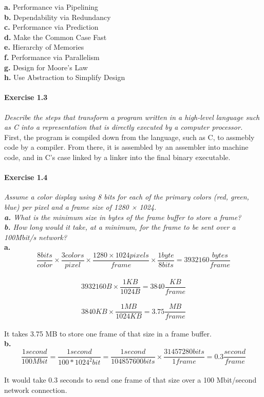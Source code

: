 \documentclass[12pt]{article}
\begin{document}
\noindent
\textbf{a.} Performance via Pipelining\\
\textbf{b.} Dependability via Redundancy\\
\textbf{c.} Performance via Prediction\\
\textbf{d.} Make the Common Case Fast\\
\textbf{e.} Hierarchy of Memories\\
\textbf{f.} Performance via Parallelism\\
\textbf{g.} Design for Moore's Law\\
\textbf{h.} Use Abstraction to Simplify Design\\

\paragraph{Exercise 1.3} \textit{Describe the steps that transform a program written in a high-level
language such as C into a representation that is directly executed by a computer
processor.}\\

First, the program is compiled down from the language, such as C, to assmebly code by a compiler. From there, it is assembled by an assembler into machine code, and in C's case linked by a linker into the final binary executable.\\

\paragraph{Exercise 1.4} \textit{Assume a color display using 8 bits for each of the primary colors
(red, green, blue) per pixel and a frame size of 1280 × 1024.\\
\textbf{a.} What is the minimum size in bytes of the frame buffer to store a frame?\\
\textbf{b.} How long would it take, at a minimum, for the frame to be sent over a 100Mbit/s network?}\\

\noindent
\textbf{a.} $$\frac{8 bits}{color} \times \frac{3 colors}{pixel} \times \frac{1280 \times 1024 pixels}{frame} \times \frac{1 byte}{8 bits} = 3932160 \frac{bytes}{frame}$$\\
            $$3932160 B \times \frac{1 KB}{1024 B} = 3840 \frac{KB}{frame}$$\\
            $$3840 KB \times \frac{1 MB}{1024 KB} = 3.75 \frac{MB}{frame}$$\\
It takes 3.75 MB to store one frame of that size in a frame buffer.\\

\textbf{b.} $$\frac{1 second}{100Mbit} = \frac{1 second}{100 * 1024^{2} bit} = \frac{1 second}{104857600 bits} \times \frac{31457280 bits}{1 frame} = 0.3 \frac{second}{frame}$$\\
It would take 0.3 seconds to send one frame of that size over a 100 Mbit/second network connection.\\
\end{document}
